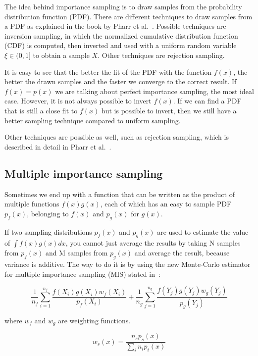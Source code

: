\documentclass[11pt,a4paper]{report}
\begin{document}
The idea behind importance sampling is to draw samples from the probability distribution function (PDF). There are different techniques to draw samples from a PDF as explained in the book by Pharr et al.~\cite{pharr2017}. Possible techniques are inversion sampling, in which the normalized cumulative distribution function (CDF) is computed, then inverted and used with a uniform random variable $\xi \in (0, 1]$ to obtain a sample $X$. Other techniques are rejection sampling.
 
It is easy to see that the better the fit of the PDF with the function $f(x)$, the better the drawn samples and the faster we converge to the correct result. If $f(x) = p(x)$ we are talking about perfect importance sampling, the most ideal case. However, it is not always possible to invert $f(x)$. If we can find a PDF that is still a close fit to $f(x)$ but is possible to invert, then we still have a better sampling technique compared to uniform sampling.

Other techniques are possible as well, such as rejection sampling, which is described in detail in Pharr et al.~\cite{pharr2017}.

\subsection{Multiple importance sampling}

Sometimes we end up with a function that can be written as the product of multiple functions $f(x)g(x)$, each of which has an easy to sample PDF $p_f(x)$, belonging to $f(x)$ and $p_g(x)$ for $g(x)$.

If two sampling distributions $p_f(x)$ and $p_g(x)$ are used to estimate the value of $\int f(x)g(x) dx$, you cannot just average the results by taking N samples from $p_f(x)$ and M samples from $p_g(x)$ and average the result, because variance is additive. The way to do it is by using the new Monte-Carlo estimator for multiple importance sampling (MIS) stated in~\cite{pharr2017}: 

\begin{equation}
\frac{1}{n_f} \sum_{i=1}^{n_f} \frac{f(X_i)g(X_i) w_f(X_i)}{p_f(X_i)} + 
\frac{1}{n_g} \sum_{j=1}^{n_g} \frac{f(Y_j)g(Y_j) w_g(Y_j)}{p_g(Y_j)} 
\end{equation}

where $w_f$ and $w_g$ are weighting functions.

\begin{equation}
w_s(x) = \frac{n_sp_s(x)}{\sum_i n_i p_i(x)}
\end{equation}
\end{document}
